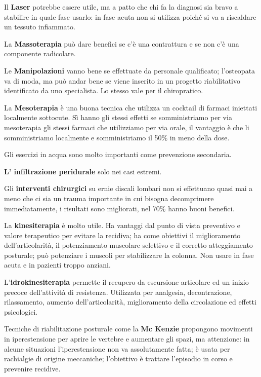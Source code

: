 \documentclass[]{article}
\begin{document}
Il \textbf{Laser} potrebbe essere utile, ma a patto che chi fa la
diagnosi sia bravo a stabilire in quale fase usarlo: in fase acuta non
si utilizza poiché si va a riscaldare un tessuto infiammato.

La \textbf{Massoterapia} può dare benefici se c'è una contrattura e se
non c'è una componente radicolare.

Le \textbf{Manipolazioni} vanno bene se effettuate da personale
qualificato; l'osteopata va di moda, ma può andar bene se viene inserito
in un progetto riabilitativo identificato da uno specialista. Lo stesso
vale per il chiropratico.

La \textbf{Mesoterapia} è una buona tecnica che utilizza un cocktail di
farmaci iniettati localmente sottocute. Sì hanno gli stessi effetti se
somministriamo per via mesoterapia gli stessi farmaci che utilizziamo
per via orale, il vantaggio è che li somministriamo localmente e
somministriamo il 50\% in meno della dose.

Gli esercizi in acqua sono molto importanti come prevenzione secondaria.

\textbf{L' infiltrazione peridurale} solo nei casi estremi.

Gli \textbf{interventi chirurgici} su ernie discali lombari non si
effettuano quasi mai a meno che ci sia un trauma importante in cui
bisogna decomprimere immediatamente, i risultati sono migliorati, nel
70\% hanno buoni benefici.

La \textbf{kinesiterapia} è molto utile. Ha vantaggi dal punto di vista
preventivo e valore terapeutico per evitare la recidiva; ha come
obiettivi il miglioramento dell'articolarità, il potenziamento muscolare
selettivo e il corretto atteggiamento posturale; può potenziare i
muscoli per stabilizzare la colonna. Non usare in fase acuta e in
pazienti troppo anziani.

L'\textbf{idrokinesiterapia} permette il recupero da escursione
articolare ed un inizio precoce dell'attività di resistenza. Utilizzata
per analgesia, decontrazione, rilassamento, aumento dell'articolarità,
miglioramento della circolazione ed effetti psicologici.

Tecniche di riabilitazione posturale come la \textbf{Mc Kenzie}
propongono movimenti in iperestensione per aprire le vertebre e
aumentare gli spazi, ma attenzione: in alcune situazioni
l'iperestensione non va assolutamente fatta; è usata per rachialgie di
origine meccaniche; l'obiettivo è trattare l'episodio in corso e
prevenire recidive.
\end{document}
